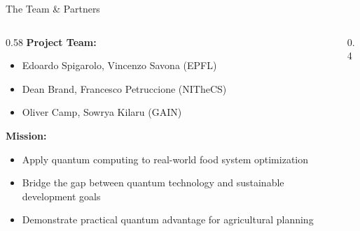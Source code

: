 \documentclass[aspectratio=169,10pt]{beamer}
\begin{document}
\begin{frame}{The Team \& Partners}
    
    \vspace{-0.1cm}
    \begin{columns}[T]
        
        \begin{column}{0.58\textwidth}
            \small\textbf{Project Team:}
            \begin{itemize}
                \item Edoardo Spigarolo, Vincenzo Savona (EPFL)
                \item Dean Brand, Francesco Petruccione (NITheCS)
                \item Oliver Camp, Sowrya Kilaru (GAIN)
            \end{itemize}
            
            
            \small\textbf{Mission:}
            \begin{itemize}
                \item Apply quantum computing to real-world food system optimization
                \item Bridge the gap between quantum technology and sustainable development goals
                \item Demonstrate practical quantum advantage for agricultural planning
            \end{itemize}
            
            
        \end{column}

    \begin{column}{0.4\textwidth}
    \vspace{-1cm}
\end{column}
\end{columns}
\end{frame}
\end{document}
